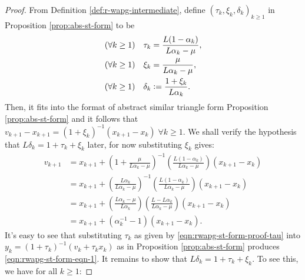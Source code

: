 \documentclass[12pt]{article}
\begin{document}
        \begin{proof}
            From Definition \ref{def:r-wapg-intermediate}, define $(\tau_k, \xi_k, \delta_k)_{k \ge 1}$ in Proposition \ref{prop:abs-st-form} to be
            \begin{align}
                (\forall k \ge 1) \quad 
                \tau_k &= \frac{L(1 - \alpha_k)}{L\alpha_k - \mu}, 
                \label{eqn:rwapg-st-form-proof-tau}
                \\
                (\forall k \ge 1)\quad 
                \xi_k &= \frac{\mu}{L \alpha_k - \mu},
                \\
                (\forall k \ge 1)\quad 
                \delta_k &\vcentcolon= \frac{1 + \xi_k}{L\alpha_k}. 
            \end{align}
            Then, it fits into the format of abstract similar triangle form Proposition \ref{prop:abs-st-form} and it follows that $v_{k + 1} - x_{k + 1} = (1 + \xi_k)^{-1}(x_{k + 1} - x_k)\; \forall k \ge 1$. 
            We shall verify the hypothesis that $L\delta_k = 1 + \tau_k + \xi_k$ later, for now substituting $\xi_k$ gives: 
            \begin{align*}
                v_{k + 1} &= 
                x_{k + 1} + \left(
                    1 + \frac{\mu}{L\alpha_k - \mu}
                \right)^{-1}\left(
                    \frac{L(1 - \alpha_k)}{L\alpha_k - \mu}
                \right)(x_{k + 1} - x_k)
                \\
                &= 
                x_{k + 1} + \left(
                    \frac{L\alpha_k}{L\alpha_k - \mu}
                \right)^{-1}\left(
                    \frac{L(1 - \alpha_k)}{L\alpha_k - \mu}
                \right)(x_{k + 1} - x_k)
                \\
                &= 
                x_{k + 1} + \left(
                    \frac{L\alpha_k - \mu}{L\alpha_k}
                \right)\left(
                    \frac{L - L\alpha_k}{L\alpha_k - \mu}
                \right)(x_{k + 1} - x_k)
                \\
                &= x_{k + 1} + (\alpha_k^{-1} - 1)(x_{k + 1} - x_k). 
            \end{align*}
            It's easy to see that substituting $\tau_k$ as given by \eqref{eqn:rwapg-st-form-proof-tau} into $y_k = (1 + \tau_k)^{-1}(v_k + \tau_k x_k)$ as in Proposition \ref{prop:abs-st-form} produces \eqref{eqn:rwapg-st-form-eqn-1}. 
            It remains to show that $L\delta_k = 1 + \tau_k + \xi_k$. 
            To see this, we have for all $k\ge 1$: 

\end{proof}
\end{document}
